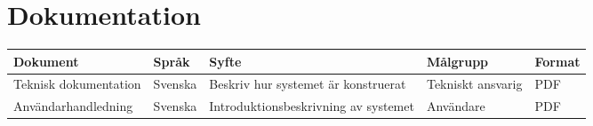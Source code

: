 \section{Dokumentation}

\begin{center}
	\begin{table}[h]
		\begin{tabularx}{\textwidth}{| l | l | X | l | l |}
			\hline
			\textbf{Dokument} & \textbf{Språk} & \textbf{Syfte} & \textbf{Målgrupp} & \textbf{Format} \\
			\hline
			Teknisk dokumentation & Svenska & Beskriv hur systemet är konstruerat & Tekniskt ansvarig & PDF \\
			\hline
			Användarhandledning & Svenska & Introduktionsbeskrivning av systemet & Användare & PDF \\
			\hline
		\end{tabularx}
	\end{table}
\end{center}

\begin{LIPSkravlista}
\end{LIPSkravlista}
